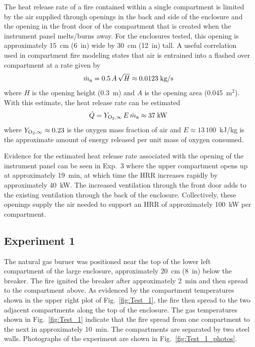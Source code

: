 \documentclass[12pt]{article}
\begin{document}
The heat release rate of a fire contained within a single compartment is limited by the air supplied through openings in the back and side of the enclosure and the opening in the front door of the compartment that is created when the instrument panel melts/burns away. For the enclosures tested, this opening is approximately 15~cm (6~in) wide by 30~cm (12~in) tall. A useful correlation~\cite{SFPE:Walton} used in compartment fire modeling states that air is entrained into a flashed over compartment at a rate given by
\begin{equation}
   \dot{m}_{\rm a} = 0.5  \, A \, \sqrt{H}  \approx 0.0123 \; \hbox{kg/s}
\end{equation}
where $H$ is the opening height (0.3~m) and $A$ is the opening area (0.045~m$^2$). With this estimate, the heat release rate can be estimated
\begin{equation}
   \dot{Q} = Y_{\rm O_2,\infty} \, E \, \dot{m}_{\rm a} \approx 37 \; \hbox{kW}
\end{equation}
where $Y_{\rm O_2,\infty}\approx 0.23$ is the oxygen mass fraction of air and $E\approx 13\,100$~kJ/kg is the approximate amount of energy released per unit mass of oxygen consumed. 

Evidence for the estimated heat release rate associated with the opening of the instrument panel can be seen in Exp.~3 where the upper compartment opens up at approximately 19~min, at which time the HRR increases rapidly by approximately 40~kW. The increased ventilation through the front door adds to the existing ventilation through the back of the enclosure. Collectively, these openings supply the air needed to support an HRR of approximately 100~kW per compartment.



\clearpage

\subsection{Experiment 1}

The natural gas burner was positioned near the top of the lower left compartment of the large enclosure, approximately 20~cm (8~in) below the breaker. The fire ignited the breaker after approximately 2~min and then spread to the compartment above. As evidenced by the compartment temperatures shown in the upper right plot of Fig.~\ref{fig:Test_1}, the fire then spread to the two adjacent compartments along the top of the enclosure. The gas temperatures shown in Fig.~\ref{fig:Test_1} indicate that the fire spread from one compartment to the next in approximately 10~min. The compartments are separated by two steel walls. Photographs of the experiment are shown in Fig.~\ref{fig:Test_1_photos}.
\end{document}
